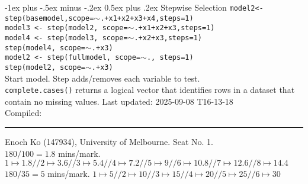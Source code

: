 \documentclass[10pt,landscape]{article}
\makeatletter
\renewcommand{\subsubsection}{\@startsection{subsubsection}{3}{0mm}%
                                {-1ex plus -.5ex minus -.2ex}%
                                {0.5ex plus .2ex}%
                                {\normalfont\small\bfseries}}
\makeatother
\begin{document}
\begin{multicols}{3}
\subsubsection{Stepwise Selection}
\texttt{model2<-step(basemodel,scope=$\sim$.+x1+x2+x3+x4,steps=1)\\
model3 <- step(model2, scope=$\sim$.+x1+x2+x3,steps=1)\\
model4 <- step(model3, scope=$\sim$.+x2+x3,steps=1)\\
step(model4, scope=$\sim$.+x3)\\
model2 <- step(fullmodel, scope=$\sim$., steps=1)\\
step(model2, scope=$\sim$.+x3)}\\
Start model. Step adds/removes each variable to test.\\
\medskip
\texttt{complete.cases()} returns a logical vector that identifies rows in a dataset that contain no missing values.
\vfill
Last updated:
2025-09-08 T16-13-18\\
Compiled: \DTMnow\\
\hrule
Enoch Ko (147934), University of Melbourne. Seat No. 1.\\
$180/100 = 1.8$ mins/mark. $1 \mapsto 1.8 // 2 \mapsto 3.6 //3 \mapsto 5.4 // 4 \mapsto 7.2 // 5 \mapsto 9 // 6 \mapsto 10.8 // 7 \mapsto 12.6// 8\mapsto 14.4$\\
$180/35 = 5$ mins/mark. $1 \mapsto 5 // 2 \mapsto 10 //3 \mapsto 15 // 4 \mapsto 20 // 5 \mapsto 25 // 6 \mapsto 30$\\
\end{multicols}
\end{document}
